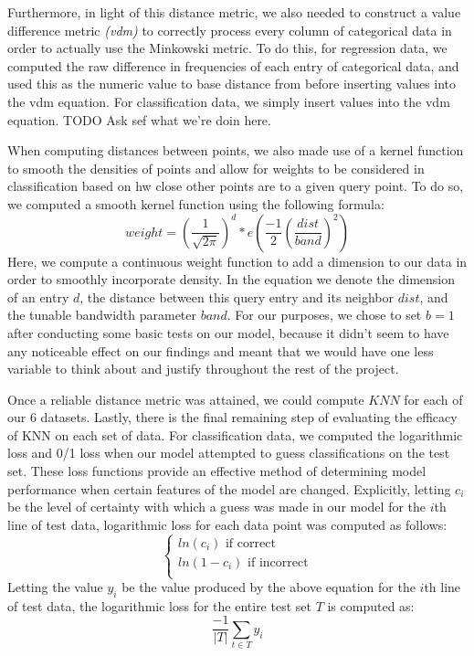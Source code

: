 \documentclass[twoside,11pt]{article}
\begin{document}
Furthermore, in light of this distance metric, we also needed to construct a value difference metric \textit{(vdm)} to correctly process every column of
categorical data in order to actually use the Minkowski metric. To do this, for regression data, we computed the raw difference in frequencies
of each entry of categorical data, and used this as the numeric value to base distance from before inserting values into the vdm equation.
 For classification data, we simply insert values into the vdm equation. 
 TODO Ask sef what we're doin here.
 
 When computing distances between points, we also made use of a kernel function to smooth the densities of points and allow for weights to be
 considered in classification based on hw close other points are to a given query point. To do so, we computed a smooth kernel function using the following
 formula:
 \begin{equation}
 weight = (\frac{1}{\sqrt{2\pi}})^d * e(\frac{-1}{2} (\frac{dist}{band})^2)
 \end{equation}
 Here, we compute a continuous weight function to add a dimension to our data in order to smoothly incorporate density. In the equation we denote the dimension
 of an entry $d$, the distance between this query entry and its neighbor $dist$, and the tunable bandwidth parameter $band$. For our purposes, we chose to set
 $b=1$ after conducting some basic tests on our model, because it didn't seem to have any noticeable effect on our findings and meant that we would have one less
 variable to think about and justify throughout the rest of the project.
 
 Once a reliable distance metric was attained, we could compute $KNN$ for each of our 6 datasets. Lastly, there is the final remaining step of evaluating 
 the efficacy of KNN on each set of data. For classification data, we computed the logarithmic loss and 0/1 loss when our model attempted to guess
 classifications on the test set. 
These loss functions provide an effective method of determining model performance when certain features of the model are changed. Explicitly, letting $c_i$ be the level 
of certainty with which a guess was made in our model for the $i$th line of test data, logarithmic loss for each data point was computed as follows:
\[\begin{cases}
	ln(c_i) \text{ if correct}\\
	ln(1-c_i) \text{ if incorrect}\\
\end{cases}\]
Letting the value $y_i$ be the value produced by the above equation for the $i$th line of test data, the logarithmic loss  for the entire test set $T$ is computed
as:
\begin{equation}
\frac{-1}{|T|}\sum_{t \in T}^{ } y_i
\end{equation}
\end{document}
